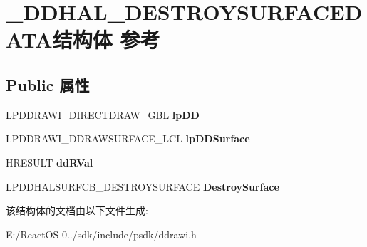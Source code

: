 \hypertarget{struct___d_d_h_a_l___d_e_s_t_r_o_y_s_u_r_f_a_c_e_d_a_t_a}{}\section{\+\_\+\+D\+D\+H\+A\+L\+\_\+\+D\+E\+S\+T\+R\+O\+Y\+S\+U\+R\+F\+A\+C\+E\+D\+A\+T\+A结构体 参考}
\label{struct___d_d_h_a_l___d_e_s_t_r_o_y_s_u_r_f_a_c_e_d_a_t_a}
\subsection*{Public 属性}
\begin{DoxyCompactItemize}
\item 
\mbox{\label{struct___d_d_h_a_l___d_e_s_t_r_o_y_s_u_r_f_a_c_e_d_a_t_a_a30655f2d7ee31af3afe49adb30c7dae6}} 
L\+P\+D\+D\+R\+A\+W\+I\+\_\+\+D\+I\+R\+E\+C\+T\+D\+R\+A\+W\+\_\+\+G\+BL {\bfseries lp\+DD}
\item 
\mbox{\label{struct___d_d_h_a_l___d_e_s_t_r_o_y_s_u_r_f_a_c_e_d_a_t_a_a4d0dc66a950edc2e86f4bc96a5f1d831}} 
L\+P\+D\+D\+R\+A\+W\+I\+\_\+\+D\+D\+R\+A\+W\+S\+U\+R\+F\+A\+C\+E\+\_\+\+L\+CL {\bfseries lp\+D\+D\+Surface}
\item 
\mbox{\label{struct___d_d_h_a_l___d_e_s_t_r_o_y_s_u_r_f_a_c_e_d_a_t_a_a6ffbbec4059ac0d7e5d4c567357d3b7b}} 
H\+R\+E\+S\+U\+LT {\bfseries dd\+R\+Val}
\item 
\mbox{\label{struct___d_d_h_a_l___d_e_s_t_r_o_y_s_u_r_f_a_c_e_d_a_t_a_add840c17a57824c733b4430f7f61a475}} 
L\+P\+D\+D\+H\+A\+L\+S\+U\+R\+F\+C\+B\+\_\+\+D\+E\+S\+T\+R\+O\+Y\+S\+U\+R\+F\+A\+CE {\bfseries Destroy\+Surface}
\end{DoxyCompactItemize}


该结构体的文档由以下文件生成\+:\begin{DoxyCompactItemize}
\item 
E\+:/\+React\+O\+S-\/0../sdk/include/psdk/ddrawi.\+h\end{DoxyCompactItemize}

